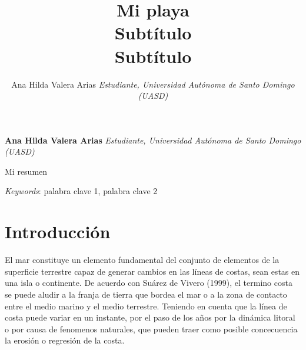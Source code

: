 \documentclass[11pt,]{article}
\title{Mi playa\\
Subtítulo\\
Subtítulo  }
\author{\Large Ana Hilda Valera Arias\vspace{0.05in} \newline\normalsize\emph{Estudiante, Universidad Autónoma de Santo Domingo (UASD)}  }
\date{}
\newcommand*{\authorfont}{\fontfamily{phv}\selectfont}
\renewenvironment{abstract}
 {{%
    \setlength{\leftmargin}{0mm}
    \setlength{\rightmargin}{\leftmargin}%
  }%
  \relax}
 {\endlist}
\begin{document}
	
%

{%
\setlength{\parindent}{0pt}
\thispagestyle{plain}
{\fontsize{18}{20}\selectfont\raggedright 
\maketitle  %

}

{
   \vskip 13.5pt\relax \normalsize\fontsize{11}{12} 
\textbf{\authorfont Ana Hilda Valera Arias} \hskip 15pt \emph{\small Estudiante, Universidad Autónoma de Santo Domingo (UASD)}   

}

}








\begin{abstract}

    \hbox{\vrule height .2pt width 39.14pc}

    \vskip 8.5pt %

\noindent Mi resumen


\vskip 8.5pt \noindent \emph{Keywords}: palabra clave 1, palabra clave 2 \par

    \hbox{\vrule height .2pt width 39.14pc}



\end{abstract}


\vskip 6.5pt


\noindent  \section{Introducción}\label{introducciuxf3n}

El mar constituye un elemento fundamental del conjunto de elementos de
la superficie terrestre capaz de generar cambios en las líneas de
costas, sean estas en una isla o continente. De acuerdo con Suárez de
Vivero (1999), el termino costa se puede aludir a la franja de tierra
que bordea el mar o a la zona de contacto entre el medio marino y el
medio terrestre. Teniendo en cuenta que la línea de costa puede variar
en un instante, por el paso de los años por la dinámica litoral o por
causa de fenomenos naturales, que pueden traer como posible concecuencia
la erosión o regresión de la costa.
\end{document}
